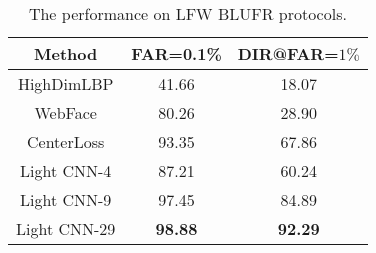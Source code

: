 \documentclass[journal,transmag]{IEEEtran}
\begin{document}
\begin{table}
\centering
\caption{The performance on LFW BLUFR protocols.}
\begin{tabular}{|c|c|c|}
\hline
Method & FAR=0.1\% & DIR@FAR=$1\%$\\
\hline
HighDimLBP \cite{DBLP:conf/icb/LiaoLYL14} & 41.66 & 18.07\\
WebFace \cite{yi2014learning} & 80.26 & 28.90\\
CenterLoss \cite{wen2016discriminative}  & 93.35 & 67.86 \\
\hline
Light CNN-4 & 87.21& 60.24\\
Light CNN-9 & 97.45 & 84.89\\
Light CNN-29 & \textbf{98.88}& \textbf{92.29}\\
\hline
\end{tabular}
\label{tab:blufr}
\end{table}
\end{document}
